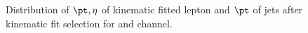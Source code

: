 \begin{figure}
    \vfil
    \caption{Distribution of $\pt, \eta$ of kinematic fitted lepton and $\pt$ of jets
    after kinematic fit selection for \mujets and \ejets channel.}
    \label{fig:kfitPlot1}
\end{figure}


